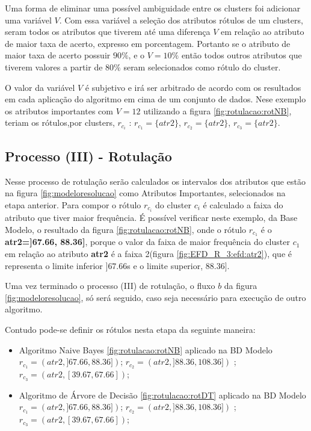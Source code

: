 Uma forma de eliminar uma possível ambiguidade entre os clusters foi adicionar uma variável  ${V}$. Com essa variável a seleção dos atributos rótulos de um clusters, seram todos os atributos que tiverem até uma diferença ${V}$ em relação ao atributo de maior taxa de acerto, expresso em porcentagem. Portanto se o atributo de maior taxa de acerto possuir ${90\%}$, e o ${V=10\%}$  então todos outros atributos que tiverem valores a partir de ${80\%}$ seram selecionados como rótulo do cluster.  

O valor da variável ${V}$ é subjetivo e irá ser arbitrado de acordo com os resultados em cada aplicação do algoritmo em cima de um conjunto de dados. Nese exemplo os atributos importantes com ${V=12}$ utilizando a figura \ref{fig:rotulacao:rotNB}, teriam os rótulos,por clusters, ${r_{c_i}}$ : ${r_{c_1}=\{atr2\}}$, ${r_{c_2}=\{atr2\}}$, ${r_{c_3}=\{atr2\}}$.

\subsection{Processo (III) - Rotulação}

Nesse processo de rotulação serão calculados os intervalos dos atributos que estão na figura \ref{fig:modeloresolucao} como Atributos Importantes, selecionados na etapa anterior. Para compor o rótulo ${r_{c_i}}$ do cluster ${c_i}$ é calculado a faixa do atributo  que tiver maior frequência. 
É possível verificar neste exemplo, da Base Modelo, o resultado da figura \ref{fig:rotulacao:rotNB}, onde o rótulo ${r_{c_1}}$ é o  \textbf{atr2=]67.66, 88.36]}, porque o valor da faixa de maior frequência do cluster ${c_1}$ em relação ao atributo \textbf{atr2} é a faixa 2(figura \ref{fig:EFD_R_3:efd:atr2}), que é representa o limite inferior ${]67.66}$s e o limite superior, ${88.36]}$.

Uma vez terminado o processo (III) de rotulação, o fluxo ${b}$ da figura \ref{fig:modeloresolucao}, só será seguido, caso seja necessário para execução de outro algoritmo.

Contudo pode-se definir os rótulos nesta etapa da seguinte maneira:


\begin{itemize}[noitemsep]
            \item Algoritmo Naive Bayes  \ref{fig:rotulacao:rotNB} aplicado na BD Modelo
            \subitem ${r_{c_1}=(atr2,]67.66, 88.36])}$;
            \subitem ${r_{c_2}=(atr2,]88.36, 108.36])}$ ;
            \subitem ${r_{c_3}=(atr2,[39.67, 67.66])}$;
            
            \item Algoritmo de Árvore de Decisão  \ref{fig:rotulacao:rotDT} aplicado na BD Modelo
            \subitem ${r_{c_1}=(atr2,]67.66, 88.36])}$;
            \subitem ${r_{c_2}=(atr2,]88.36, 108.36])}$ ;
            \subitem ${r_{c_3}=(atr2,[39.67, 67.66])}$;
\end{itemize}

